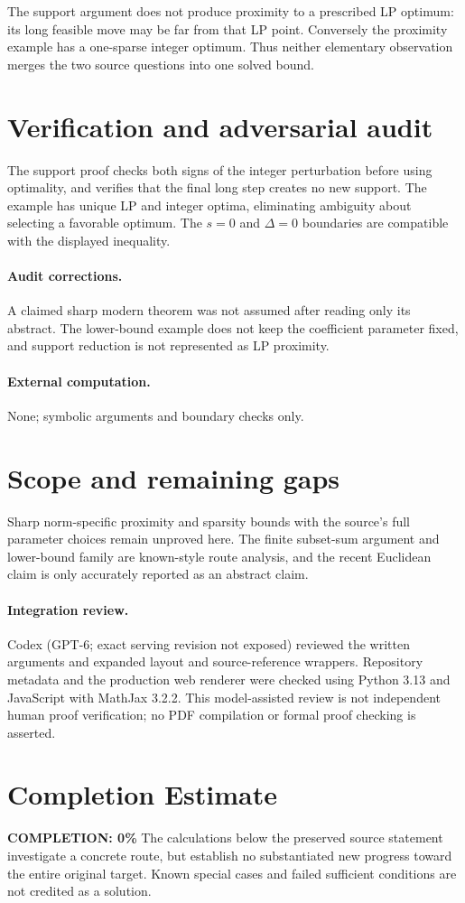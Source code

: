 \documentclass[11pt]{article}
\begin{document}
The support argument does not produce proximity to a prescribed LP optimum: its long feasible move may be far from that LP point. Conversely the proximity example has a one-sparse integer optimum. Thus neither elementary observation merges the two source questions into one solved bound.
\section{Verification and adversarial audit}
The support proof checks both signs of the integer perturbation before using optimality, and verifies that the final long step creates no new support. The example has unique LP and integer optima, eliminating ambiguity about selecting a favorable optimum. The $s=0$ and $\Delta=0$ boundaries are compatible with the displayed inequality.
\paragraph{Audit corrections.} A claimed sharp modern theorem was not assumed after reading only its abstract. The lower-bound example does not keep the coefficient parameter fixed, and support reduction is not represented as LP proximity.
\paragraph{External computation.} None; symbolic arguments and boundary checks only.
\section{Scope and remaining gaps}
Sharp norm-specific proximity and sparsity bounds with the source's full parameter choices remain unproved here. The finite subset-sum argument and lower-bound family are known-style route analysis, and the recent Euclidean claim is only accurately reported as an abstract claim.
\paragraph{Integration review.} Codex (GPT-6; exact serving revision not exposed) reviewed the written arguments and expanded layout and source-reference wrappers. Repository metadata and the production web renderer were checked using Python 3.13 and JavaScript with MathJax 3.2.2. This model-assisted review is not independent human proof verification; no PDF compilation or formal proof checking is asserted.

\section{Completion Estimate}
\noindent\textbf{COMPLETION: 0\%}
The calculations below the preserved source statement investigate a concrete route,
but establish no substantiated new progress toward the entire original target.
Known special cases and failed sufficient conditions are not credited as a solution.
\end{document}
